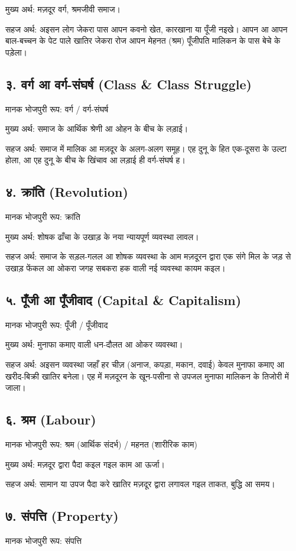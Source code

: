 \documentclass[12pt,a4paper,oneside]{book}
\begin{document}
मुख्य अर्थ: मज़दूर वर्ग, श्रमजीवी समाज।

सहज अर्थ: अइसन लोग जेकरा पास आपन कवनो खेत, कारखाना या पूँजी नइखे। आपन आ आपन बाल-बच्चन के पेट पाले खातिर जेकरा रोज आपन मेहनत (श्रम) पूँजीपति मालिकन के पास बेचे के पड़ेला।


\subsection*{३. वर्ग आ वर्ग-संघर्ष {\engfont (Class \& Class Struggle)}}
मानक भोजपुरी रूप: वर्ग / वर्ग-संघर्ष

मुख्य अर्थ: समाज के आर्थिक श्रेणी आ ओहन के बीच के लड़ाई।

सहज अर्थ: समाज में मालिक आ मज़दूर के अलग-अलग समूह। एह दुनू के हित एक-दूसरा के उल्टा होला, आ एह दुनू के बीच के खिंचाव आ लड़ाई ही वर्ग-संघर्ष ह।


\subsection*{४. क्रांति {\engfont (Revolution)}}
मानक भोजपुरी रूप: क्रांति

मुख्य अर्थ: शोषक ढाँचा के उखाड़ के नया न्यायपूर्ण व्यवस्था लावल।

सहज अर्थ: समाज के सड़ल-गलल आ शोषक व्यवस्था के आम मज़दूरन द्वारा एक संगे मिल के जड़ से उखाड़ फेंकल आ ओकरा जगह सबकरा हक वाली नई व्यवस्था कायम कइल।


\subsection*{५. पूँजी आ पूँजीवाद {\engfont (Capital \& Capitalism)}}
मानक भोजपुरी रूप: पूँजी / पूँजीवाद

मुख्य अर्थ: मुनाफा कमाए वाली धन-दौलत आ ओकर व्यवस्था।

सहज अर्थ: अइसन व्यवस्था जहाँ हर चीज़ (अनाज, कपड़ा, मकान, दवाई) केवल मुनाफा कमाए आ खरीद-बिक्री खातिर बनेला। एह में मज़दूरन के खून-पसीना से उपजल मुनाफा मालिकन के तिजोरी में जाला।


\subsection*{६. श्रम {\engfont (Labour)}}
मानक भोजपुरी रूप: श्रम (आर्थिक संदर्भ) / महनत (शारीरिक काम)

मुख्य अर्थ: मज़दूर द्वारा पैदा कइल गइल काम आ ऊर्जा।

सहज अर्थ: सामान या उपज पैदा करे खातिर मज़दूर द्वारा लगावल गइल ताकत, बुद्धि आ समय।


\subsection*{७. संपत्ति {\engfont (Property)}}
मानक भोजपुरी रूप: संपत्ति
\end{document}
